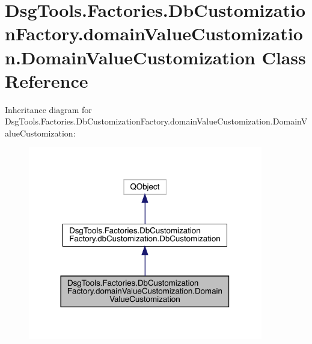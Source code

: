 \hypertarget{class_dsg_tools_1_1_factories_1_1_db_customization_factory_1_1domain_value_customization_1_1_domain_value_customization}{}\section{Dsg\+Tools.\+Factories.\+Db\+Customization\+Factory.\+domain\+Value\+Customization.\+Domain\+Value\+Customization Class Reference}
\label{class_dsg_tools_1_1_factories_1_1_db_customization_factory_1_1domain_value_customization_1_1_domain_value_customization}


Inheritance diagram for Dsg\+Tools.\+Factories.\+Db\+Customization\+Factory.\+domain\+Value\+Customization.\+Domain\+Value\+Customization\+:
\nopagebreak
\begin{figure}[H]
\begin{center}
\leavevmode
\includegraphics[width=290pt]{class_dsg_tools_1_1_factories_1_1_db_customization_factory_1_1domain_value_customization_1_1_dom6b2a4de44b2d460b8b2291b360772108}
\end{center}
\end{figure}


